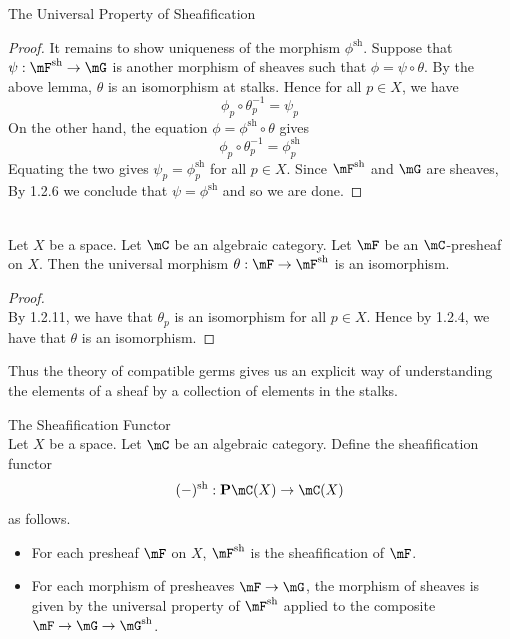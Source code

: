 \documentclass[a4paper]{article}
\begin{document}
\begin{prp}{The Universal Property of Sheafification}{}
\begin{proof}
It remains to show uniqueness of the morphism $\phi^\text{sh}$. Suppose that $\psi:\mF^\text{sh}\to\mG$ is another morphism of sheaves such that $\phi=\psi\circ\theta$. By the above lemma, $\theta$ is an isomorphism at stalks. Hence for all $p\in X$, we have $$\phi_p\circ\theta_p^{-1}=\psi_p$$ On the other hand, the equation $\phi=\phi^\text{sh}\circ\theta$ gives $$\phi_p\circ\theta_p^{-1}=\phi_p^\text{sh}$$ Equating the two gives $\psi_p=\phi_p^\text{sh}$ for all $p\in X$. Since $\mF^\text{sh}$ and $\mG$ are sheaves, By 1.2.6 we conclude that $\psi=\phi^\text{sh}$ and so we are done. 
\end{proof}
\end{prp}

\begin{lmm}{}{}\\
Let $X$ be a space. Let $\mC$ be an algebraic category. Let $\mF$ be an $\mC$-presheaf on $X$. Then the universal morphism $\theta:\mF\to\mF^\text{sh}$ is an isomorphism. 
\begin{proof}\\
By 1.2.11, we have that $\theta_p$ is an isomorphism for all $p\in X$. Hence by 1.2.4, we have that $\theta$ is an isomorphism. 
\end{proof}
\end{lmm}

Thus the theory of compatible germs gives us an explicit way of understanding the elements of a sheaf by a collection of elements in the stalks. 

\begin{defn}{The Sheafification Functor}{}\\
Let $X$ be a space. Let $\mC$ be an algebraic category. Define the sheafification functor $$(-)^\text{sh}:\bold{P}\mC(X)\to\mC(X)$$ as follows. 
\begin{itemize}
\item For each presheaf $\mF$ on $X$, $\mF^\text{sh}$ is the sheafification of $\mF$. 
\item For each morphism of presheaves $\mF\to\mG$, the morphism of sheaves is given by the universal property of $\mF^\text{sh}$ applied to the composite $\mF\to\mG\to\mG^\text{sh}$. 
\end{itemize}
\end{defn}
\end{document}
